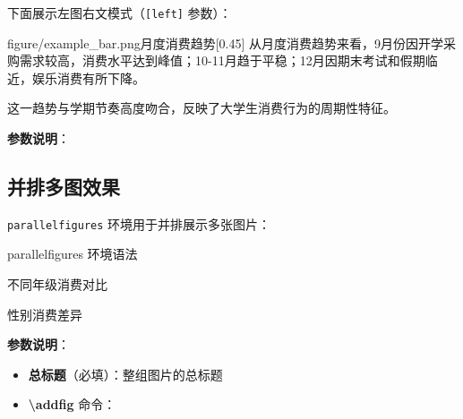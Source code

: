 \documentclass[linux]{hustreport}
\begin{document}
下面展示左图右文模式（\texttt{[left]} 参数）：

\begin{textfigure}[left]{figure/example_bar.png}{月度消费趋势}[0.45]
    从月度消费趋势来看，9月份因开学采购需求较高，消费水平达到峰值；10-11月趋于平稳；12月因期末考试和假期临近，娱乐消费有所下降。
    
    这一趋势与学期节奏高度吻合，反映了大学生消费行为的周期性特征。
\end{textfigure}

\textbf{参数说明}：
\begin{optionlist}
\end{optionlist}


\subsection{并排多图效果}

\texttt{parallelfigures} 环境用于并排展示多张图片：

\begin{codeonly}{parallelfigures 环境语法}

\begin{parallelfigures}{不同年级消费对比}
\end{parallelfigures}

\begin{parallelfigures}{性别消费差异}
\end{parallelfigures}
\end{codeonly}

\textbf{参数说明}：
\begin{itemize}
    \item \textbf{总标题}（必填）：整组图片的总标题
    \item \textbf{\textbackslash addfig} 命令：
    \begin{optionlist}
    \end{optionlist}
\end{itemize}
\end{document}
